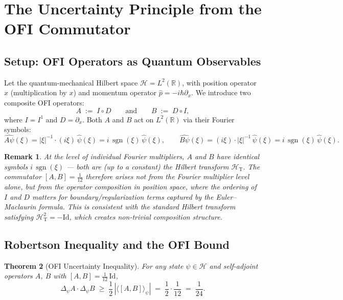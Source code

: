 \documentclass[12pt]{article}
\newtheorem{theorem}{Theorem}[section]
\newtheorem{remark}[theorem]{Remark}
\theoremstyle{definition}
\newcommand{\R}{\mathbb{R}}
\newcommand{\abs}[1]{\left|#1\right|}
\newcommand{\expect}[1]{\langle #1 \rangle}
\newcommand{\Id}{\mathrm{Id}}
\newcommand{\sgn}{\operatorname{sgn}}
\begin{document}
\section{The Uncertainty Principle from the OFI Commutator}
\label{sec:uncertainty}

\subsection{Setup: OFI Operators as Quantum Observables}

Let the quantum-mechanical Hilbert space $\mathcal{H} = L^2(\R)$, with
position operator $\hat{x}$ (multiplication by $x$) and momentum operator
$\hat{p} = -i\hbar\partial_x$.  We introduce two composite OFI operators:
\begin{equation}
  A \;:=\; I \circ D
  \qquad\text{and}\qquad
  B \;:=\; D \circ I,
  \label{eq:AB}
\end{equation}
where $I = I^1$ and $D = \partial_x$.  Both $A$ and $B$ act on $L^2(\R)$
via their Fourier symbols:
\begin{equation}
  \widehat{A\psi}(\xi) = |\xi|^{-1}\cdot(i\xi)\,\hat\psi(\xi)
  = i\,\sgn(\xi)\,\hat\psi(\xi),
  \qquad
  \widehat{B\psi}(\xi) = (i\xi)\cdot|\xi|^{-1}\,\hat\psi(\xi)
  = i\,\sgn(\xi)\,\hat\psi(\xi).
\end{equation}

\begin{remark}
At the level of individual Fourier multipliers, $A$ and $B$ have identical
symbols $i\,\sgn(\xi)$ — both are (up to a constant) the Hilbert transform
$\mathcal{H}_{\mathrm{T}}$.  The commutator $[A,B] = \tfrac{1}{12}$
therefore arises not from the Fourier multiplier level alone, but from the
operator composition in position space, where the ordering of $I$ and $D$
matters for boundary/regularization terms captured by the Euler--Maclaurin
formula.  This is consistent with the standard Hilbert transform satisfying
$\mathcal{H}_{\mathrm{T}}^2 = -\Id$, which creates non-trivial composition
structure.
\end{remark}

\subsection{Robertson Inequality and the OFI Bound}

\begin{theorem}[OFI Uncertainty Inequality]
\label{thm:uncertainty}
For any state $\psi \in \mathcal{H}$ and self-adjoint operators $A$, $B$
with $[A,B] = \tfrac{1}{12}\,\Id$,
\begin{equation}
  \Delta_\psi A \cdot \Delta_\psi B
  \;\geq\;
  \frac{1}{2}\,\abs{\expect{[A,B]}_\psi}
  \;=\;
  \frac{1}{2} \cdot \frac{1}{12}
  \;=\;
  \frac{1}{24}.
  \label{eq:ofi-uncertainty}
\end{equation}
\end{theorem}
\end{document}
